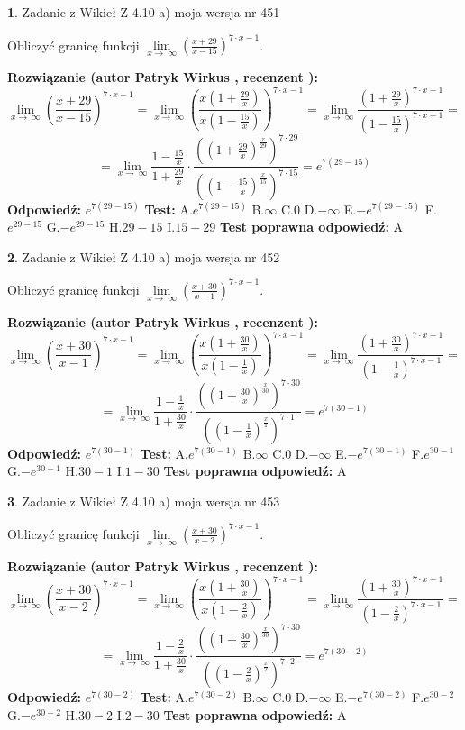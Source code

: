 \documentclass[12pt, a4paper]{article}
\theoremstyle{definition} %
\newtheorem{zad}{}
\newcommand{\zadStart}[1]{\begin{zad}#1\newline}
\newcommand{\zadStop}{\end{zad}}
\newcommand{\rozwStart}[2]{\noindent \textbf{Rozwiązanie (autor #1 , recenzent #2): }\newline}
\newcommand{\rozwStop}{\newline}
\newcommand{\odpStart}{\noindent \textbf{Odpowiedź:}\newline}
\newcommand{\odpStop}{\newline}
\newcommand{\testStart}{\noindent \textbf{Test:}\newline}
\newcommand{\testStop}{\newline}
\newcommand{\kluczStart}{\noindent \textbf{Test poprawna odpowiedź:}\newline}
\newcommand{\kluczStop}{\newline}
\begin{document}
\zadStart{Zadanie z Wikieł Z 4.10 a) moja wersja nr 451}


Obliczyć granicę funkcji  $\lim\limits_{x\to\ \infty}(\frac{x+29}{x-15})^{7\cdot x-1}$.
\zadStop
\rozwStart{Patryk Wirkus}{}
$$\lim\limits_{x\to\ \infty}(\frac{x+29}{x-15})^{7\cdot x-1} = \lim\limits_{x\to\ \infty}(\frac{x(1+\frac{29}{x})}{x(1-\frac{15}{x})})^{7\cdot x-1}=\lim\limits_{x\to\ \infty}\frac{(1+\frac{29}{x})^{7\cdot x-1}}{(1-\frac{15}{x})^{7\cdot x-1}}=$$
$$=\lim\limits_{x\to\ \infty}\frac{1-\frac{15}{x}}{1+\frac{29}{x}}\cdot\frac{((1+\frac{29}{x})^{\frac{x}{29}})^{7\cdot29}}{((1-\frac{15}{x})^{\frac{x}{15}})^{7\cdot15}}=e^{7(29-15)}$$
\rozwStop
\odpStart
$e^{7(29-15)}$
\odpStop
\testStart
A.$e^{7(29-15)}$ B.$\infty$ C.$0$ D.$-\infty$ E.$-e^{7(29-15)}$
F.$e^{29-15}$ G.$-e^{29-15}$
H.$29-15$
I.$15-29$
\testStop
\kluczStart
A
\kluczStop



\zadStart{Zadanie z Wikieł Z 4.10 a) moja wersja nr 452}


Obliczyć granicę funkcji  $\lim\limits_{x\to\ \infty}(\frac{x+30}{x-1})^{7\cdot x-1}$.
\zadStop
\rozwStart{Patryk Wirkus}{}
$$\lim\limits_{x\to\ \infty}(\frac{x+30}{x-1})^{7\cdot x-1} = \lim\limits_{x\to\ \infty}(\frac{x(1+\frac{30}{x})}{x(1-\frac{1}{x})})^{7\cdot x-1}=\lim\limits_{x\to\ \infty}\frac{(1+\frac{30}{x})^{7\cdot x-1}}{(1-\frac{1}{x})^{7\cdot x-1}}=$$
$$=\lim\limits_{x\to\ \infty}\frac{1-\frac{1}{x}}{1+\frac{30}{x}}\cdot\frac{((1+\frac{30}{x})^{\frac{x}{30}})^{7\cdot30}}{((1-\frac{1}{x})^{\frac{x}{1}})^{7\cdot1}}=e^{7(30-1)}$$
\rozwStop
\odpStart
$e^{7(30-1)}$
\odpStop
\testStart
A.$e^{7(30-1)}$ B.$\infty$ C.$0$ D.$-\infty$ E.$-e^{7(30-1)}$
F.$e^{30-1}$ G.$-e^{30-1}$
H.$30-1$
I.$1-30$
\testStop
\kluczStart
A
\kluczStop



\zadStart{Zadanie z Wikieł Z 4.10 a) moja wersja nr 453}


Obliczyć granicę funkcji  $\lim\limits_{x\to\ \infty}(\frac{x+30}{x-2})^{7\cdot x-1}$.
\zadStop
\rozwStart{Patryk Wirkus}{}
$$\lim\limits_{x\to\ \infty}(\frac{x+30}{x-2})^{7\cdot x-1} = \lim\limits_{x\to\ \infty}(\frac{x(1+\frac{30}{x})}{x(1-\frac{2}{x})})^{7\cdot x-1}=\lim\limits_{x\to\ \infty}\frac{(1+\frac{30}{x})^{7\cdot x-1}}{(1-\frac{2}{x})^{7\cdot x-1}}=$$
$$=\lim\limits_{x\to\ \infty}\frac{1-\frac{2}{x}}{1+\frac{30}{x}}\cdot\frac{((1+\frac{30}{x})^{\frac{x}{30}})^{7\cdot30}}{((1-\frac{2}{x})^{\frac{x}{2}})^{7\cdot2}}=e^{7(30-2)}$$
\rozwStop
\odpStart
$e^{7(30-2)}$
\odpStop
\testStart
A.$e^{7(30-2)}$ B.$\infty$ C.$0$ D.$-\infty$ E.$-e^{7(30-2)}$
F.$e^{30-2}$ G.$-e^{30-2}$
H.$30-2$
I.$2-30$
\testStop
\kluczStart
A
\kluczStop
\end{document}
